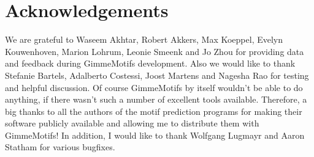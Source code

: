 \documentclass[11pt]{article}
\begin{document}
\section{Acknowledgements}
We are grateful to Waseem Akhtar, Robert Akkers, Max Koeppel, Evelyn Kouwenhoven, Marion Lohrum, Leonie Smeenk and Jo Zhou for providing data and feedback during GimmeMotifs development. Also we would like to thank Stefanie Bartels, Adalberto Costessi, Joost Martens and Nagesha Rao for testing and helpful discussion.
Of course GimmeMotifs by itself wouldn't be able to do anything, if there wasn't such a number of excellent tools available. Therefore, a big thanks to all the authors of the motif prediction programs for making their software publicly available and allowing me to distribute them with GimmeMotifs!
In addition, I would like to thank Wolfgang Lugmayr and Aaron Statham for various bugfixes.


\end{document}
